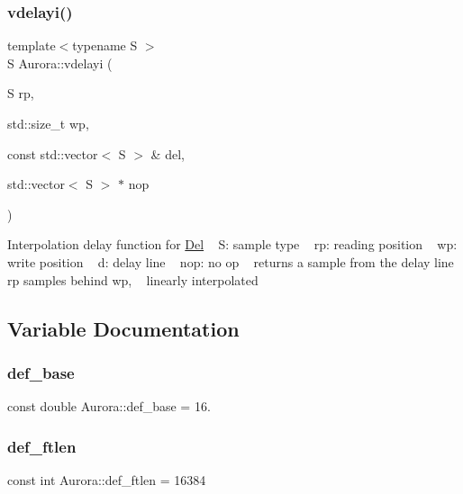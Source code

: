 \subsubsection{\texorpdfstring{vdelayi()}{vdelayi()}}
{\footnotesize\ttfamily template$<$typename S $>$ \\
S Aurora\+::vdelayi (\begin{DoxyParamCaption}\item[{S}]{rp,  }\item[{std\+::size\+\_\+t}]{wp,  }\item[{const std\+::vector$<$ S $>$ \&}]{del,  }\item[{std\+::vector$<$ S $>$ $\ast$}]{nop }\end{DoxyParamCaption})\hspace{0.3cm}{\ttfamily [inline]}}

Interpolation delay function for \hyperlink{class_aurora_1_1_del}{Del} ~\newline
S\+: sample type ~\newline
rp\+: reading position ~\newline
wp\+: write position ~\newline
d\+: delay line ~\newline
nop\+: no op ~\newline
returns a sample from the delay line rp samples behind wp, ~\newline
linearly interpolated 

\subsection{Variable Documentation}
\mbox{\label{namespace_aurora_acb267dff62f74484893c2d5b679b78bf}} 
\subsubsection{\texorpdfstring{def\+\_\+base}{def\_base}}
{\footnotesize\ttfamily const double Aurora\+::def\+\_\+base = 16.}

\mbox{\label{namespace_aurora_a14dabfd9feedfa09c0e6f86d2627f006}} 
\subsubsection{\texorpdfstring{def\+\_\+ftlen}{def\_ftlen}}
{\footnotesize\ttfamily const int Aurora\+::def\+\_\+ftlen = 16384}

